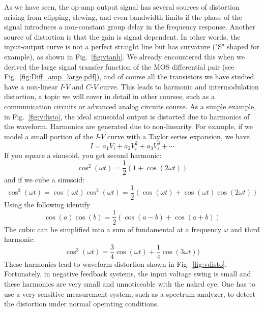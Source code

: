As we have seen, the op-amp output signal has several sources of distortion arising from clipping, slewing, and even bandwidth limits if the phase of the signal introduces a non-constant group delay in the frequency response.  Another source of distortion is that the gain is signal dependent.  In other words, the input-output curve is not a perfect straight line but has curvature ("S" shaped for example), as shown in Fig.~\ref{fig:vtanh}.  We already encountered this when we derived the large signal transfer function of the MOS differential pair (see Fig.~\ref{fig:Diff_amp_large.pdf}), and of course all the transistors we have studied have a non-linear $I$-$V$ and $C$-$V$ curve.  This leads to harmonic and intermodulation distortion, a topic we will cover in detail in other courses, such as a communication circuits or advanced analog circuits course.  As a simple example, in Fig.~\ref{fig:vdisto}, the ideal sinusoidal output is distorted due to harmonics of the waveform.  Harmonics are generated due to non-linearity.  For example, if we model a small portion of the $I$-$V$ curve with a Taylor series expansion, we have
    \begin{equation}
        I = a_1 V_i + a_2 V_i^2 + a_3 V_i^3 + \cdots
    \end{equation}
If you square a sinusoid, you get second harmonic:
    \begin{equation}
        \cos^2(\omega t) = \frac{1}{2} \left(1 + \cos(2 \omega t) \right)
    \end{equation}
and if we cube a sinusoid:
    \begin{equation}
        \cos^3(\omega t) = \cos(\omega t) \cos^2(\omega t) = \frac{1}{2} \left(\cos(\omega t) + \cos(\omega t)\cos(2 \omega t) \right)
    \end{equation}
Using the following identify
    \begin{equation}
        \cos(a) \cos(b) = \frac{1}{2} \left( \cos(a - b) + \cos(a + b) \right) 
    \end{equation}
The cubic can be simplified into a sum of fundamental at a frequency $\omega$ and third harmonic:
    \begin{equation}
        \cos^3(\omega t) =  \frac{3}{4} \cos(\omega t) + \frac{1}{4} \cos(3 \omega t)) 	
    \end{equation}
These harmonics lead to waveform distortion shown in Fig.~\ref{fig:vdisto}.  Fortunately, in negative feedback systems, the input voltage swing is small and these harmonics are very small and unnoticeable with the naked eye.  One has to use a very sensitive measurement system, such as a spectrum analyzer, to detect the distortion under normal operating conditions.
